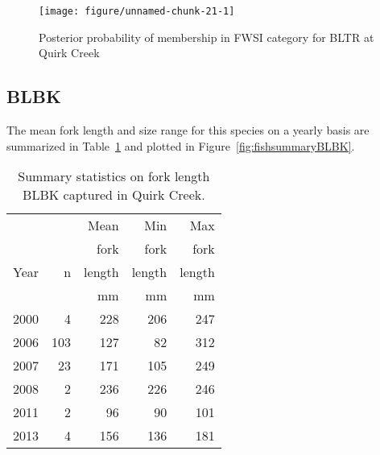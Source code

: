 \documentclass[]{article}\usepackage[]{graphicx}\usepackage[]{color}
\makeatletter
\def\maxwidth{ %
  \ifdim\Gin@nat@width>\linewidth
    \linewidth
  \else
    \Gin@nat@width
  \fi
}
\newenvironment{knitrout}{}{} %
\makeatother
\begin{document}
\begin{figure}[h]
\begin{center}
\begin{knitrout}
\color{fgcolor}
\texttt{[image: figure/unnamed-chunk-21-1]} 

\end{knitrout}
\end{center}
\caption{Posterior probability of membership in FWSI category for  BLTR at Quirk Creek}
\label{fig:fsiplotBLTR}
\end{figure}






\clearpage %
\subsection{ BLBK}



The  mean fork length and size range for this species on a yearly basis are summarized in 
Table~\ref{tab:fishsummaryBLBK} 
and plotted in 
Figure~\ref{fig:fishsummaryBLBK}.

\begin{table}[h]
\centering
\captionsetup{width=.9\linewidth}
\caption{Summary statistics on fork length BLBK captured in Quirk Creek.}
\label{tab:fishsummaryBLBK}
\begin{tabular}{| l | r r r r | } \hline
           &           &  Mean   &  Min     & Max     \\
           &           &  fork   &  fork    & fork    \\
Year       &   n       &  length &  length  & length  \\
           &           & mm      &  mm      &  mm     \\ \hline
2000  &  4  &  228  &  206  &  247 \\ 
2006  &  103  &  127  &  82  &  312 \\ 
2007  &  23  &  171  &  105  &  249 \\ 
2008  &  2  &  236  &  226  &  246 \\ 
2011  &  2  &  96  &  90  &  101 \\ 
2013  &  4  &  156  &  136  &  181 \\ 
\hline 

\end{tabular}
\end{table}
\end{document}
